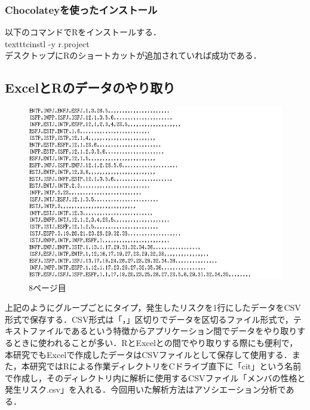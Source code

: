 \newpage
\subsubsection{Chocolateyを使ったインストール}



以下のコマンドでRをインストールする．\\

texttt{cinstl -y r.project}\\

デスクトップにRのショートカットが追加されていれば成功である．

\newpage

\subsection{ExcelとRのデータのやり取り}

\begin{figure}[!htbp]
\centering 
\includegraphics[width=13cm]{Acsv.png}
\caption{8ページ目}
\end{figure}



上記のようにグループごとにタイプ，発生したリスクを1行にしたデータをCSV形式で保存する．CSV形式は「，」区切りでデータを区切るファイル形式で，テキストファイルであるという特徴からアプリケーション間でデータをやり取りするときに使われることが多い．RとExcelとの間でやり取りする際にも便利で，本研究でもExcelで作成したデータはCSVファイルとして保存して使用する．また，本研究ではRによる作業ディレクトリをCドライブ直下に「cit」という名前で作成し，そのディレクトリ内に解析に使用するCSVファイル「メンバの性格と発生リスク.csv」を入れる．今回用いた解析方法はアソシエーション分析である．
\newpage

